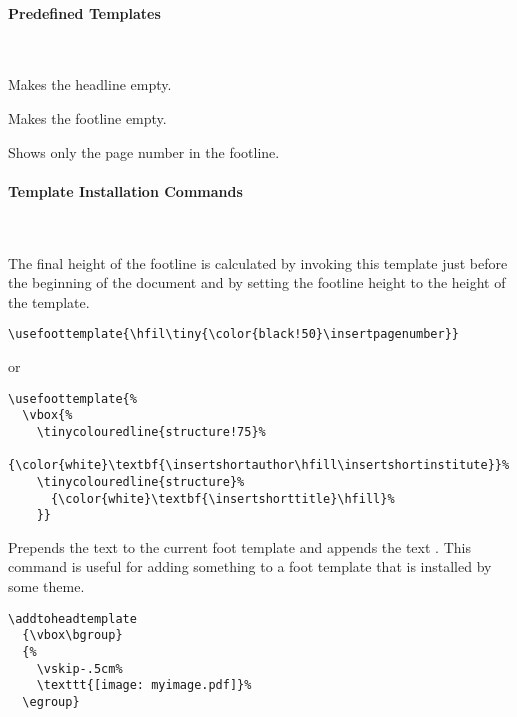 \label{section-head-templates}

\paragraph{Predefined Templates}\ 

\begin{command}{\beamertemplateheadempty}
  Makes the headline empty.
\end{command}

\begin{command}{\beamertemplatefootempty}
  Makes the footline empty.
\end{command}

\begin{command}{\beamertemplatefootpagenumber}
  Shows only the page number in the footline.
\end{command}



\paragraph{Template Installation Commands}\ 

\begin{command}{\usefoottemplate{}}
  The final height of the footline is calculated by invoking this
  template just before the beginning of the document and by setting
  the footline height to the height of the template.
  \example
\begin{verbatim}
\usefoottemplate{\hfil\tiny{\color{black!50}\insertpagenumber}}
\end{verbatim}
or
\begin{verbatim}
\usefoottemplate{%
  \vbox{%
    \tinycolouredline{structure!75}%
      {\color{white}\textbf{\insertshortauthor\hfill\insertshortinstitute}}%
    \tinycolouredline{structure}%
      {\color{white}\textbf{\insertshorttitle}\hfill}%
    }}
\end{verbatim}
\end{command}

\begin{command}{\addtofoottemplate{}}
  Prepends the text  to the current foot template and
  appends the text . This command is useful for adding
  something to a foot template that is installed by some theme.
  \example
\begin{verbatim}
\addtoheadtemplate
  {\vbox\bgroup}
  {%
    \vskip-.5cm%
    \texttt{[image: myimage.pdf]}%
  \egroup}
\end{verbatim}
\end{command}


